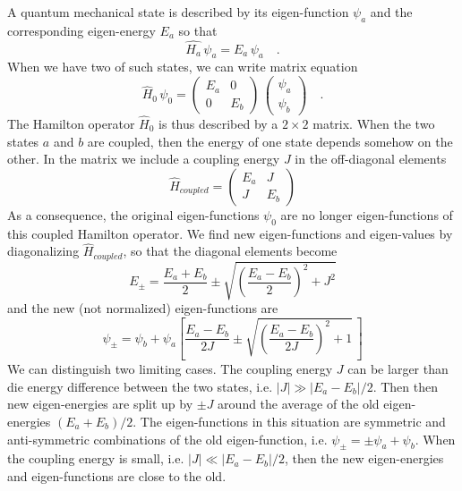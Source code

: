 A quantum mechanical state is described by its eigen-function $\psi_a$ and the corresponding eigen-energy $E_a$ so that 
\begin{equation}
\hat{H_a}  \, \psi_a = E_a  \,\psi_a  \quad .
\end{equation}
When we have two of such states, we can  write matrix equation
\begin{equation}
\hat{H}_0 \, \psi_0 = \begin{pmatrix}  E_a & 0 \\ 0 & E_b \end{pmatrix} \,
	 \begin{pmatrix}  \psi_ a\\ \psi_b\end{pmatrix}  \quad .
\end{equation}
The Hamilton operator $\hat{H}_0$ is thus described by a $2 \times 2$ matrix. When the two states $a$ and $b$ are coupled, then the energy of one state depends somehow on the other. In the matrix we include a coupling energy $J$ in the off-diagonal elements
\begin{equation}
\hat{H}_{coupled}  = \begin{pmatrix}  E_a & J \\ J & E_b \end{pmatrix} 
\end{equation}
As a consequence, the original eigen-functions $\psi_0$ are no longer eigen-functions of this coupled Hamilton operator. We find new eigen-functions and eigen-values by diagonalizing $\hat{H}_{coupled}$, so that the diagonal elements become
\begin{equation}
 E_\pm = \frac{E_a + E_b}{2} \pm \sqrt{ \left( \frac{E_a - E_b}{2} \right)^2 + J^2 }
\end{equation}
and the new (not normalized) eigen-functions are
\begin{equation}
 \psi_{\pm} = \psi_b + \psi_a \left[ \frac{E_a - E_b}{2 J} \pm \sqrt{ \left( \frac{E_a - E_b}{2 J} \right)^2 + 1  } \, \right]
\end{equation}
We can distinguish two limiting cases. The coupling energy $J$ can be larger than die energy difference between the two states, i.e. $|J| \gg |E_a - E_b| / 2$. Then then new eigen-energies are split up by $\pm J$ around the average of the old eigen-energies $(E_a + E_b) /2$. The eigen-functions in this situation are symmetric and anti-symmetric combinations of the old eigen-function, i.e. $\psi_\pm = \pm \psi_a + \psi_b$. When the coupling energy is small, i.e. $|J| \ll |E_a - E_b| / 2$, then the new eigen-energies and eigen-functions are close to the old.



